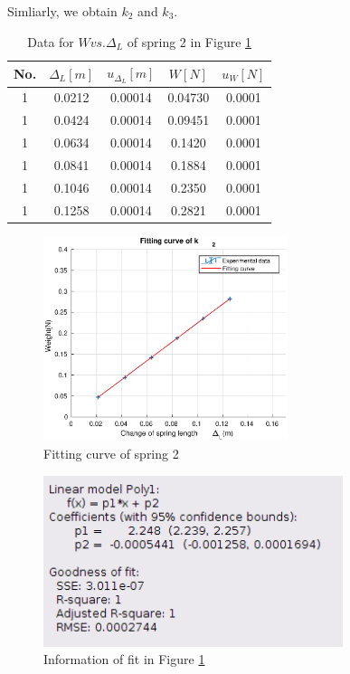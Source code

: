     Simliarly, we obtain $k_2$ and $k_3$.
    \begin{table}[!htbp] \small
        \centering
        \begin{tabular}{|c|c|c|c|c|}
            \hline
            No. & $\Delta_L[m]$ & $u_{\Delta_L}[m]$ & $W[N]$ & $u_{W}[N]$\\ \hline
            1 & 0.0212 & 0.00014& 0.04730 & 0.0001\\ \hline
            1 & 0.0424 & 0.00014& 0.09451 & 0.0001\\ \hline
            1 & 0.0634 & 0.00014& 0.1420 & 0.0001\\ \hline
            1 & 0.0841 & 0.00014& 0.1884 & 0.0001\\ \hline
            1 & 0.1046 & 0.00014& 0.2350 & 0.0001\\ \hline
            1 & 0.1258 & 0.00014& 0.2821 & 0.0001\\ \hline
        \end{tabular}
        \caption{Data for $W vs. \Delta_L$ of spring 2 in Figure \ref{k_2}}\label{k2data}
    \end{table}
    \begin{figure}[!h]
        \centering
        \includegraphics[height=6cm]{images/k2.eps}
        \caption{Fitting curve of spring 2}\label{k_2}
    \end{figure}
    \begin{figure}[!h]
        \centering
        \includegraphics[height=5cm]{images/k2info.png}
        \caption{Information of fit in Figure \ref{k_2}}\label{k2info}
    \end{figure}
